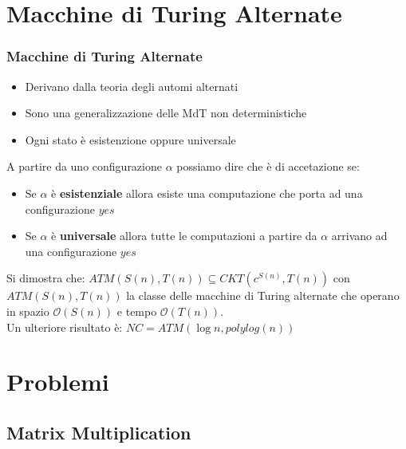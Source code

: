 \documentclass{beamer}
\newcommand{\bigO}{\ensuremath{\mathcal{O}}} %
\begin{document}
\section{Macchine di Turing Alternate}
\begin{frame}
	\frametitle{Macchine di Turing Alternate} %
	\begin{itemize}
		\item Derivano dalla teoria degli automi alternati
		\item Sono una generalizzazione delle MdT non deterministiche
		\item Ogni stato è esistenzione oppure universale
	\end{itemize}
	A partire da uno configurazione $\alpha$ possiamo dire che è di accetazione se:
	\begin{itemize}
		\item Se $\alpha$ è \textbf{esistenziale} allora esiste una computazione che porta ad una configurazione $yes$
		\item Se $\alpha$ è \textbf{universale} allora tutte le computazioni a partire da $\alpha$ arrivano ad una configurazione $yes$
	\end{itemize}
	Si dimostra che: $ATM(S(n),T(n)) \subseteq CKT(c^{S(n)},T(n))$ con $ATM(S(n),T(n))$ la classe delle macchine di Turing alternate che operano in spazio $\bigO{(S(n))}$ e tempo $\bigO{(T(n))}$.\\
	Un ulteriore risultato è: $NC = ATM(\log n,polylog(n))$

	
\end{frame}

\section{Problemi}
\subsection{Matrix Multiplication}
\end{document}
